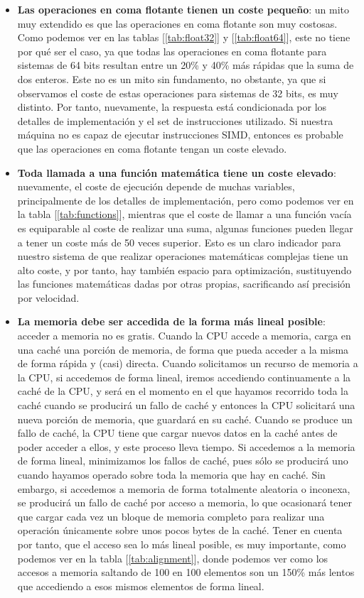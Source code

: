\begin{itemize}
	\item \textbf{Las operaciones en coma flotante tienen un coste pequeño}: un mito muy extendido es que las operaciones en coma flotante son muy costosas. Como podemos ver en las tablas [\ref{tab:float32}] y [\ref{tab:float64}], este no tiene por qué ser el caso, ya que todas las operaciones en coma flotante para sistemas de 64 bits resultan entre un 20\% y 40\% más rápidas que la suma de dos enteros. Este no es un mito sin fundamento, no obstante, ya que si observamos el coste de estas operaciones para sistemas de 32 bits, es muy distinto. Por tanto, nuevamente, la respuesta está condicionada por los detalles de implementación y el set de instrucciones utilizado. Si nuestra máquina no es capaz de ejecutar instrucciones SIMD, entonces es probable que las operaciones en coma flotante tengan un coste elevado.
	\item \textbf{Toda llamada a una función matemática tiene un coste elevado}: nuevamente, el coste de ejecución depende de muchas variables, principalmente de los detalles de implementación, pero como podemos ver en la tabla [\ref{tab:functions}], mientras que el coste de llamar a una función vacía es equiparable al coste de realizar una suma, algunas funciones pueden llegar a tener un coste más de 50 veces superior. Esto es un claro indicador para nuestro sistema de que realizar operaciones matemáticas complejas tiene un alto coste, y por tanto, hay también espacio para optimización, sustituyendo las funciones matemáticas dadas por otras propias, sacrificando así precisión por velocidad.
	\item \textbf{La memoria debe ser accedida de la forma más lineal posible}: acceder a memoria no es gratis. Cuando la CPU accede a memoria, carga en una caché una porción de memoria, de forma que pueda acceder a la misma de forma rápida y (casi) directa. Cuando solicitamos un recurso de memoria a la CPU, si accedemos de forma lineal, iremos accediendo continuamente a la caché de la CPU, y será en el momento en el que hayamos recorrido toda la caché cuando se producirá un fallo de caché y entonces la CPU solicitará una nueva porción de memoria, que guardará en su caché. Cuando se produce un fallo de caché, la CPU tiene que cargar nuevos datos en la caché antes de poder acceder a ellos, y este proceso lleva tiempo. Si accedemos a la memoria de forma lineal, minimizamos los fallos de caché, pues sólo se producirá uno cuando hayamos operado sobre toda la memoria que hay en caché. Sin embargo, si accedemos a memoria de forma totalmente aleatoria o inconexa, se producirá un fallo de caché por acceso a memoria, lo que ocasionará tener que cargar cada vez un bloque de memoria completo para realizar una operación únicamente sobre unos pocos bytes de la caché. Tener en cuenta por tanto, que el acceso sea lo más lineal posible, es muy importante, como podemos ver en la tabla [\ref{tab:alignment}], donde podemos ver como los accesos a memoria saltando de 100 en 100 elementos son un 150\% más lentos que accediendo a esos mismos elementos de forma lineal.

\end{itemize}

